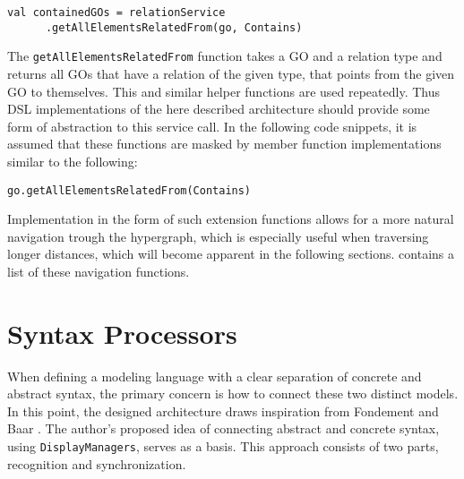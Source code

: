 \begin{lstlisting}[language=customLang, caption={Example of how to get all \texttt{GOs} contained by a given element \texttt{go} in the \textsc{CouchEdit} architecture}, captionpos=b]
val containedGOs = relationService
      .getAllElementsRelatedFrom(go, Contains) 
\end{lstlisting}

The \texttt{getAllElementsRelatedFrom} function takes a GO and a relation type and returns all GOs that have a relation of the given type, that points from the given  GO to themselves. This and similar helper functions are used repeatedly. Thus DSL implementations of the here described architecture should provide some form of abstraction to this service call. In the following code snippets, it is assumed that these functions are masked by member function implementations similar to the following:

\begin{lstlisting}[caption={The \texttt{getAllElementsRelatedFrom} function, implemented as a member function, eases navigation through the hypergraph}, captionpos=b]
go.getAllElementsRelatedFrom(Contains)
\end{lstlisting}

Implementation in the form of such extension functions allows for a more natural navigation trough the hypergraph, which is especially useful when traversing longer distances, which will become apparent in the following sections.  contains a list of these navigation functions.


\section{Syntax Processors}
When defining a modeling language with a clear separation of concrete and abstract syntax, the primary concern is how to connect these two distinct models. In this point, the designed architecture draws inspiration from Fondement and Baar \cite{fondement_making_2005}. The author's proposed idea of connecting abstract and concrete syntax, using \texttt{DisplayManagers}, serves as a basis. This approach consists of two parts, recognition and synchronization.

